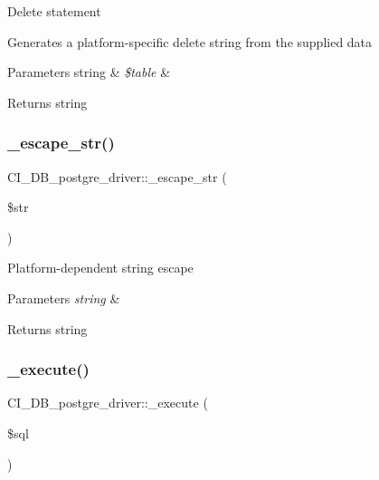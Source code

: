 Delete statement

Generates a platform-\/specific delete string from the supplied data


\begin{DoxyParams}[1]{Parameters}
string & {\em \$table} & \\
\hline
\end{DoxyParams}
\begin{DoxyReturn}{Returns}
string 
\end{DoxyReturn}
\mbox{\label{class_c_i___d_b__postgre__driver_a473b895b4bf1762fefd276d022ec8d2f}} 
\subsubsection{\texorpdfstring{\+\_\+escape\+\_\+str()}{\_escape\_str()}}
{\footnotesize\ttfamily C\+I\+\_\+\+D\+B\+\_\+postgre\+\_\+driver\+::\+\_\+escape\+\_\+str (\begin{DoxyParamCaption}\item[{}]{\$str }\end{DoxyParamCaption})\hspace{0.3cm}{\ttfamily [protected]}}

Platform-\/dependent string escape


\begin{DoxyParams}{Parameters}
{\em string} & \\
\hline
\end{DoxyParams}
\begin{DoxyReturn}{Returns}
string 
\end{DoxyReturn}
\mbox{\label{class_c_i___d_b__postgre__driver_ae728f2aec7808bb69eda61e7f83de199}} 
\subsubsection{\texorpdfstring{\+\_\+execute()}{\_execute()}}
{\footnotesize\ttfamily C\+I\+\_\+\+D\+B\+\_\+postgre\+\_\+driver\+::\+\_\+execute (\begin{DoxyParamCaption}\item[{}]{\$sql }\end{DoxyParamCaption})\hspace{0.3cm}{\ttfamily [protected]}}

